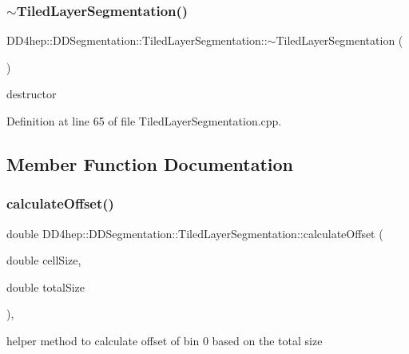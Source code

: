 \subsubsection{\texorpdfstring{$\sim$\+Tiled\+Layer\+Segmentation()}{~TiledLayerSegmentation()}}
{\footnotesize\ttfamily D\+D4hep\+::\+D\+D\+Segmentation\+::\+Tiled\+Layer\+Segmentation\+::$\sim$\+Tiled\+Layer\+Segmentation (\begin{DoxyParamCaption}{ }\end{DoxyParamCaption})\hspace{0.3cm}{\ttfamily [virtual]}}



destructor 



Definition at line 65 of file Tiled\+Layer\+Segmentation.\+cpp.



\subsection{Member Function Documentation}
\hypertarget{class_d_d4hep_1_1_d_d_segmentation_1_1_tiled_layer_segmentation_a7c5f4fe56bec27c51187a8413fe96d38}{}\label{class_d_d4hep_1_1_d_d_segmentation_1_1_tiled_layer_segmentation_a7c5f4fe56bec27c51187a8413fe96d38} 
\subsubsection{\texorpdfstring{calculate\+Offset()}{calculateOffset()}}
{\footnotesize\ttfamily double D\+D4hep\+::\+D\+D\+Segmentation\+::\+Tiled\+Layer\+Segmentation\+::calculate\+Offset (\begin{DoxyParamCaption}\item[{double}]{cell\+Size,  }\item[{double}]{total\+Size }\end{DoxyParamCaption})\hspace{0.3cm}{\ttfamily [static]}, {\ttfamily [protected]}}



helper method to calculate offset of bin 0 based on the total size 



